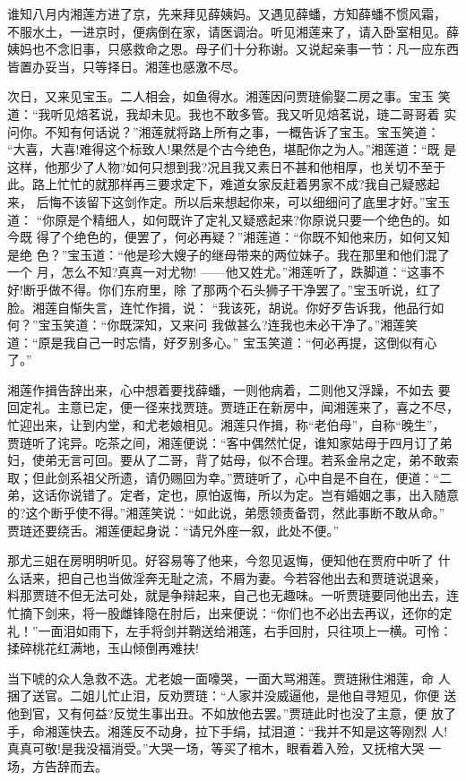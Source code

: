 谁知八月内湘莲方进了京，先来拜见薛姨妈。又遇见薛蟠，方知薛蟠不惯风霜，
不服水土，一进京时，便病倒在家，请医调治。听见湘莲来了，请入卧室相见。薛
姨妈也不念旧事，只感救命之恩。母子们十分称谢。又说起亲事一节：凡一应东西
皆置办妥当，只等择日。湘莲也感激不尽。

次日，又来见宝玉。二人相会，如鱼得水。湘莲因问贾琏偷娶二房之事。宝玉
笑道：“我听见焙茗说，我却未见。我也不敢多管。我又听见焙茗说，琏二哥哥着
实问你。不知有何话说？”湘莲就将路上所有之事，一概告诉了宝玉。宝玉笑道：
“大喜，大喜!难得这个标致人!果然是个古今绝色，堪配你之为人。”湘莲道：“既
是这样，他那少了人物?如何只想到我?况且我又素日不甚和他相厚，也关切不至于
此。路上忙忙的就那样再三要求定下，难道女家反赶着男家不成?我自己疑惑起来，
后悔不该留下这剑作定。所以后来想起你来，可以细细问了底里才好。”宝玉道：
“你原是个精细人，如何既许了定礼又疑惑起来?你原说只要一个绝色的。如今既
得了个绝色的，便罢了，何必再疑？”湘莲道：“你既不知他来历，如何又知是绝
色？”宝玉道：“他是珍大嫂子的继母带来的两位妹子。我在那里和他们混了一个
月，怎么不知?真真一对尤物!
——他又姓尤。”湘莲听了，跌脚道：“这事不好!断乎做不得。你们东府里，除
了那两个石头狮子干净罢了。”宝玉听说，红了脸。湘莲自惭失言，连忙作揖，说：
“我该死，胡说。你好歹告诉我，他品行如何？”宝玉笑道：“你既深知，又来问
我做甚么?连我也未必干净了。”湘莲笑道：“原是我自己一时忘情，好歹别多心。”
宝玉笑道：“何必再提，这倒似有心了。”

湘莲作揖告辞出来，心中想着要找薛蟠，一则他病着，二则他又浮躁，不如去
要回定礼。主意已定，便一径来找贾琏。贾琏正在新房中，闻湘莲来了，喜之不尽，
忙迎出来，让到内堂，和尤老娘相见。湘莲只作揖，称“老伯母”，自称“晚生”，
贾琏听了诧异。吃茶之间，湘莲便说：“客中偶然忙促，谁知家姑母于四月订了弟
妇，使弟无言可回。要从了二哥，背了姑母，似不合理。若系金帛之定，弟不敢索
取；但此剑系祖父所遗，请仍赐回为幸。”贾琏听了，心中自是不自在，便道：“二
弟，这话你说错了。定者，定也，原怕返悔，所以为定。岂有婚姻之事，出入随意
的?这个断乎使不得。”湘莲笑说：“如此说，弟愿领责备罚，然此事断不敢从命。”
贾琏还要绕舌。湘莲便起身说：“请兄外座一叙，此处不便。”

那尤三姐在房明明听见。好容易等了他来，今忽见返悔，便知他在贾府中听了
什么话来，把自己也当做淫奔无耻之流，不屑为妻。今若容他出去和贾琏说退亲，
料那贾琏不但无法可处，就是争辩起来，自己也无趣味。一听贾琏要同他出去，连
忙摘下剑来，将一股雌锋隐在肘后，出来便说：“你们也不必出去再议，还你的定
礼！”一面泪如雨下，左手将剑并鞘送给湘莲，右手回肘，只往项上一横。可怜：
揉碎桃花红满地，玉山倾倒再难扶!

当下唬的众人急救不迭。尤老娘一面嚎哭，一面大骂湘莲。贾琏揪住湘莲，命
人捆了送官。二姐儿忙止泪，反劝贾琏：“人家并没威逼他，是他自寻短见，你便
送他到官，又有何益?反觉生事出丑。不如放他去罢。”贾琏此时也没了主意，便
放了手，命湘莲快去。湘莲反不动身，拉下手绢，拭泪道：“我并不知是这等刚烈
人!真真可敬!是我没福消受。”大哭一场，等买了棺木，眼看着入殓，又抚棺大哭
一场，方告辞而去。

